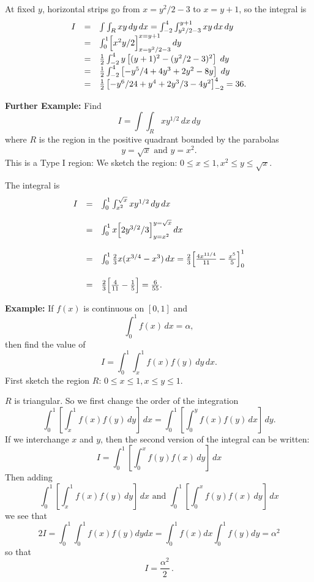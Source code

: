 \documentclass{article}
\begin{document}
At fixed $y$, horizontal
strips go from $x=y^2/2-3$ to $x=y+1$, so the integral is
$$
\begin{array}{lll}
I & = & \int \int_R xy \, dy \, dx = \int_{-2}^4 \int_{y^2/2-3}^{y+1} xy \, dx \, dy\\
  & = & \int_0^1 \Bigl[ x^2y/2 \Bigr]_{x=y^2/2-3}^{x=y+1} \, dy \\
 & = &  \frac{1}{2} \int_{-2}^4 y \left[(y+1)^2-(y^2/2-3)^2\right] \; dy \\
 & = & \frac{1}{2} \int_{-2}^4 \left[-y^5/4 +4 y^3+2y^2-8y \right] \; dy \\
 & = & \frac{1}{2} \left[-y^6/24 +y^4+2y^3/3-4y^2 \right]_{-2}^{4}=36.
 \end{array}
$$


\textbf{Further Example:} Find
$$
I = \int \int_R x y^{1/2} \, dx \, dy
$$
where $R$ is the region in the positive quadrant bounded by the parabolas 
$$
y=\sqrt{x} \mbox{  and  } y=x^2.
$$
This is a Type I region: We sketch the region: $0 \le x \le 1, x^2 \le y \le \sqrt{x}$.
\vskip 5cm



The integral is
$$
\begin{array}{lll}
I & = & \int_0^1  \int_{x^2}^{\sqrt{x}} xy^{1/2} \, dy \, dx \\
\\
 & = &  \int_0^1 x \Bigl[ 2y^{3/2}/3 \Bigr]_{y=x^2}^{y=\sqrt{x} } \, dx \\
 \\
 & = & \int_0^1 \frac{2}{3} x( x^{3/4}-x^3) \, dx =\frac{2}{3} \Bigl[\frac{4 x^{11/4}}{11} - \frac{x^5}{5} \Bigr]_0^1 \\
 \\
 & = & \frac{2}{3} \Bigl[\frac{4}{11} - \frac{1}{5} \Bigr]  = \frac{6}{55}.
 \end{array}
$$


\textbf{Example:} If $f(x)$ is continuous on $[0,1]$ and
$$
\int_0^1 f(x)\, dx = \alpha,
$$
then find the value of
$$
I = \int_0^1 \int_x^1 f(x) f(y)  \, dy \, dx.
$$
First sketch the region $R$: $ 0 \le x \le 1, x \le y \le 1$.

\vskip 5cm


%

$R$ is triangular. So we first change the order of the integration
$$
\int_0^1 \left[ \int_x^1 f(x) f(y)  \, dy  \right] \, dx = \int_0^1 \left[ \int_0^y f(x) f(y)  \, dx  \right] \, dy.
$$
If we interchange $x$ and $y$, then the second version of the integral can be written:
{\small
$$
I=\int_0^1 \left[ \int_0^x f(y) f(x)  \, dy  \right] \, dx
$$
}
Then adding
$$
\int_0^1 \left[ \int_x^1 f(x) f(y)  \, dy  \right] \, dx \mbox{  and  } \int_0^1 \left[ \int_0^x f(y) f(x)  \, dy  \right] \, dx
$$
we see that
$$
2 I = \int_0^1 \int_0^1 f(x) f(y) dy dx  = \int_0^1 f(x) dx \int_0^1 f(y) dy = \alpha^2
$$
so that 
{\small
$$
I=\frac{\alpha^2}{2}\,.
$$
}
\end{document}
